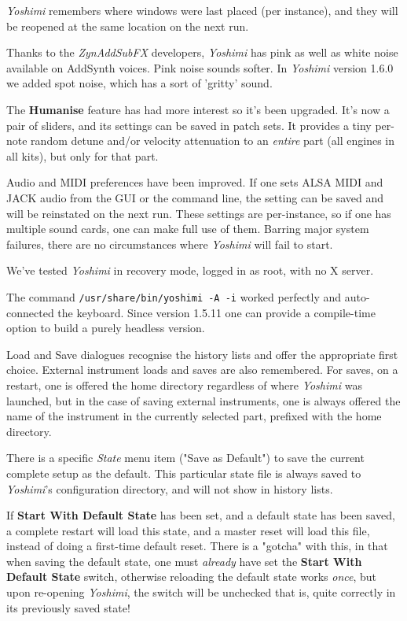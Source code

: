 \documentclass[
 11pt,
 twoside,
 a4paper,
 final                                 %
]{article}
\begin{document}
   \textsl{Yoshimi} remembers where windows were last placed (per instance),
   and they will be reopened at the same location on the next run.

   Thanks to the \textsl{ZynAddSubFX} developers, \textsl{Yoshimi} has pink
   as well as white noise available on AddSynth voices. Pink noise sounds
   softer.  In \textsl{Yoshimi} version 1.6.0 we added spot noise, which has
   a sort of 'gritty' sound.

   The \textbf{Humanise} feature has had more interest so it's been upgraded.
   It's now a pair of sliders, and its settings can be saved in patch sets.
   It provides a tiny per-note random detune and/or velocity attenuation to
   an \textsl{entire} part (all engines in all kits), but only for that part.

   Audio and MIDI preferences have been improved. If one sets ALSA MIDI
   and JACK audio from the GUI or the command line, the setting can be
   saved and will be reinstated on the next run. These settings are
   per-instance, so if one has multiple sound cards, one can make full use of
   them.  Barring major system failures, there are no circumstances where
   \textsl{Yoshimi} will fail to start.

   We've tested \textsl{Yoshimi} in recovery mode, logged in as root, with
   no X server.

   The command \texttt{/usr/share/bin/yoshimi -A -i} worked perfectly and
   auto-connected the keyboard. Since version 1.5.11 one can provide a
   compile-time option to build a purely headless version.

   Load and Save dialogues recognise the history lists and offer
   the appropriate first choice. External instrument loads and saves are
   also remembered.
   For saves, on a restart, one is offered the home directory regardless
   of where \textsl{Yoshimi} was launched, but in the case of saving
   external instruments, one is always offered the name of the instrument
   in the currently selected part, prefixed with the home directory.

   There is a specific \textsl{State} menu item ("Save as Default") to save
   the current complete setup as the default. This particular state file is
   always saved to \textsl{Yoshimi}'s configuration directory, and will not
   show in history lists.

   If \textbf{Start With Default State} has been set, and a
   default state has been saved, a complete restart will load this state,
   and a master reset will load this file, instead of doing a
   first-time default reset.
   There is a "gotcha" with this, in that when saving the default state,
   one must \textsl{already} have set the \textbf{Start With Default State}
   switch, otherwise reloading the default state works \textsl{once}, but
   upon re-opening \textsl{Yoshimi}, the switch will be unchecked
   \textemdash that is, quite correctly in its previously saved state!
\end{document}

